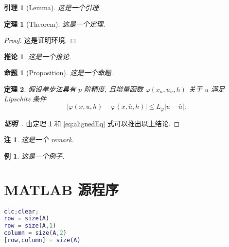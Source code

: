 \documentclass[a4paper,12pt]{article}
\theoremstyle{plain}
\newtheorem{proposition}{命题}[section]
\newtheorem{lemma}{引理}[section]
\newtheorem{theorem}{定理}[section]
\newtheorem{example}{例}[section]
\newtheorem{corollary}{推论}[section]
\newtheorem{remark}{注}[section]
\begin{document}
\begin{lemma}[Lemma]\label{lmm:foo}
这是一个引理.
\end{lemma}

\begin{theorem}[Theorem]\label{thm:foo}
这是一个定理.
\end{theorem}
\begin{proof}
这是证明环境.
\end{proof}

\begin{corollary}\label{cor:foo}
这是一个推论.
\end{corollary}

\begin{proposition}[Proposition]
这是一个命题.
\end{proposition}

\begin{theorem}\label{thm:convergence}
假设单步法具有 $p$ 阶精度, 且増量函数 $\varphi(x_{n}, u_{n}, h)$ 关于 $u$ 满足\textup{Lipschitz} 条件
\begin{equation}\label{eq:conver2}
|\varphi(x, u, h)-\varphi(x, \bar{u}, h)| \leqslant L_{\varphi}|u-\bar{u}|.
\end{equation}
\end{theorem}
\begin{proof}[\normalfont\bfseries 证明~\nopunct]
由定理 \ref{thm:foo} 和 \eqref{eq:alignedEq} 式可以推出以上结论.
\end{proof}

\begin{remark}\label{rem:remark}
这是一个 remark.
\end{remark}

\begin{example}
这是一个例子.
\end{example}



{} %





%
%
%
%
%



\section*{MATLAB 源程序}
\begin{lstlisting}[language=matlab]
clc;clear;
row = size(A)
row = size(A,1)
column = size(A,2)
[row,column] = size(A)
\end{lstlisting}
\end{document}
